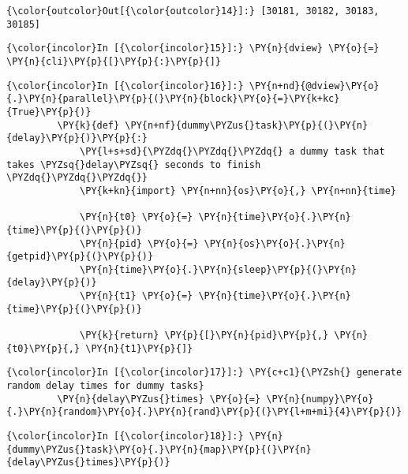             \begin{Verbatim}[commandchars=\\\{\}]
{\color{outcolor}Out[{\color{outcolor}14}]:} [30181, 30182, 30183, 30185]
\end{Verbatim}
        


    \begin{Verbatim}[commandchars=\\\{\}]
{\color{incolor}In [{\color{incolor}15}]:} \PY{n}{dview} \PY{o}{=} \PY{n}{cli}\PY{p}{[}\PY{p}{:}\PY{p}{]}
\end{Verbatim}

    \begin{Verbatim}[commandchars=\\\{\}]
{\color{incolor}In [{\color{incolor}16}]:} \PY{n+nd}{@dview}\PY{o}{.}\PY{n}{parallel}\PY{p}{(}\PY{n}{block}\PY{o}{=}\PY{k+kc}{True}\PY{p}{)}
         \PY{k}{def} \PY{n+nf}{dummy\PYZus{}task}\PY{p}{(}\PY{n}{delay}\PY{p}{)}\PY{p}{:}
             \PY{l+s+sd}{\PYZdq{}\PYZdq{}\PYZdq{} a dummy task that takes \PYZsq{}delay\PYZsq{} seconds to finish \PYZdq{}\PYZdq{}\PYZdq{}}
             \PY{k+kn}{import} \PY{n+nn}{os}\PY{o}{,} \PY{n+nn}{time}
         
             \PY{n}{t0} \PY{o}{=} \PY{n}{time}\PY{o}{.}\PY{n}{time}\PY{p}{(}\PY{p}{)}
             \PY{n}{pid} \PY{o}{=} \PY{n}{os}\PY{o}{.}\PY{n}{getpid}\PY{p}{(}\PY{p}{)}
             \PY{n}{time}\PY{o}{.}\PY{n}{sleep}\PY{p}{(}\PY{n}{delay}\PY{p}{)}
             \PY{n}{t1} \PY{o}{=} \PY{n}{time}\PY{o}{.}\PY{n}{time}\PY{p}{(}\PY{p}{)}
             
             \PY{k}{return} \PY{p}{[}\PY{n}{pid}\PY{p}{,} \PY{n}{t0}\PY{p}{,} \PY{n}{t1}\PY{p}{]}
\end{Verbatim}

    \begin{Verbatim}[commandchars=\\\{\}]
{\color{incolor}In [{\color{incolor}17}]:} \PY{c+c1}{\PYZsh{} generate random delay times for dummy tasks}
         \PY{n}{delay\PYZus{}times} \PY{o}{=} \PY{n}{numpy}\PY{o}{.}\PY{n}{random}\PY{o}{.}\PY{n}{rand}\PY{p}{(}\PY{l+m+mi}{4}\PY{p}{)}
\end{Verbatim}



    \begin{Verbatim}[commandchars=\\\{\}]
{\color{incolor}In [{\color{incolor}18}]:} \PY{n}{dummy\PYZus{}task}\PY{o}{.}\PY{n}{map}\PY{p}{(}\PY{n}{delay\PYZus{}times}\PY{p}{)}
\end{Verbatim}

